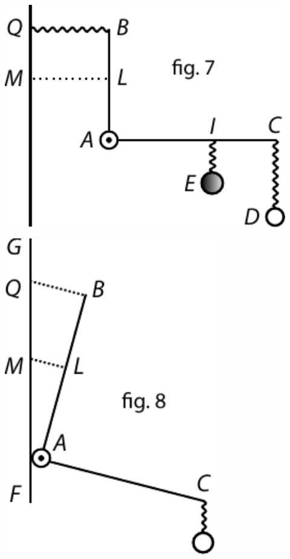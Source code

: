\begin{minipage}[t]{0.33\textwidth}
\includegraphics[width=0.92\textwidth]{gesamttex/edit_VIII,3/images/LH_37_03_073-074_d09.pdf}
\end{minipage}
\hspace{11mm}
\begin{minipage}[t]{0.33\textwidth}
\includegraphics[width=0.69\textwidth]{gesamttex/edit_VIII,3/images/LH_37_03_073-074_d10.pdf}
\end{minipage}

